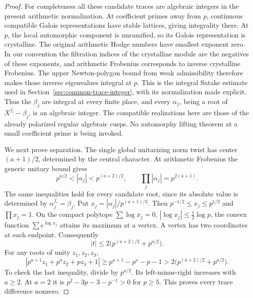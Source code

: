 \begin{proof}
For completeness all these candidate traces are algebraic
integers in the present arithmetic normalization.
At coefficient primes away from \(p\), continuous
compatible Galois representations have stable lattices,
giving integrality there.
At \(p\), the local automorphic component is unramified,
so its Galois representation is crystalline.
The original arithmetic Hodge numbers have smallest
exponent zero.
In our convention the filtration indices of the
crystalline module are the negatives of these exponents,
and arithmetic Frobenius corresponds to inverse crystalline
Frobenius.
The upper Newton-polygon bound from weak admissibility
therefore makes those inverse eigenvalues integral
at \(p\).
This is the integral Satake estimate used in
Section~\ref{sec:common-trace-integer}, with its
normalization made explicit.
Thus the \(\beta_j\) are integral at every finite place,
and every \(\alpha_j\), being a root of
\(X^{f_i}-\beta_j\), is an algebraic integer.
The compatible realizations here are those of the
already polarized regular algebraic cusps.
No automorphy lifting theorem at a small coefficient
prime is being invoked.

We next prove separation.
The single global unitarizing norm twist has center
\((a+1)/2\), determined by the central character.
At arithmetic Frobenius the generic unitary bound gives
\[
       p^{a/2}<|\alpha_j|<p^{(a+2)/2},\qquad
                       \prod_j|\alpha_j|=p^{2(a+1)} .
\]
The same inequalities hold for every candidate root,
since its absolute value is determined by
\(\alpha_j^{f_i}=\beta_j\).
Put \(x_j=|\alpha_j|/p^{(a+1)/2}\).
Then \(p^{-1/2}\le x_j\le p^{1/2}\) and \(\prod x_j=1\).
On the compact polytope
\(\sum\log x_j=0\), \(|\log x_j|\le\frac12\log p\),
the convex function \(\sum e^{\log x_j}\) attains its
maximum at a vertex.
A vertex has two coordinates at each endpoint.
Consequently
\[
                  |t|\le
                       2\bigl(p^{(a+2)/2}+p^{a/2}\bigr).
 \tag{Q4}
\]
For any roots of unity \(z_1,z_2,z_3\),
\[
 |p^{a+1}z_1+p^az_2+pz_3+1|
                       \ge p^{a+1}-p^a-p-1
                       >2\bigl(p^{(a+2)/2}+p^{a/2}\bigr).
 \tag{Q5}
\]
To check the last inequality, divide by \(p^{a/2}\).
Its left-minus-right increases with \(a\ge2\).
At \(a=2\) it is
\(p^2-3p-3-p^{-1}>0\) for \(p\ge5\).
This proves every trace difference nonzero.


\end{proof}
